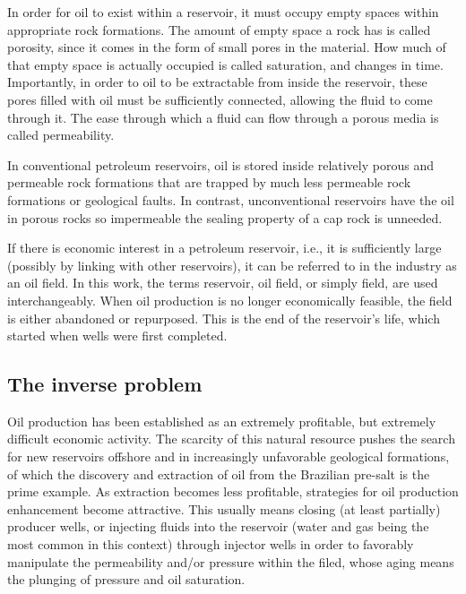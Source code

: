     In order for oil to exist within a reservoir, 
    it must occupy empty spaces within appropriate rock formations.
    The amount of empty space a rock has is called porosity, 
    since it comes in the form of small pores in the material.
    How much of that empty space is actually occupied is called saturation, and changes in time.
    Importantly, in order to oil to be extractable from inside the reservoir, 
    these pores filled with oil must be sufficiently connected,
    allowing the fluid to come through it.
    The ease through which a fluid can flow through a porous media is called permeability.

    In conventional petroleum reservoirs,
    oil is stored inside relatively porous and permeable rock formations 
    that are trapped by much less permeable rock formations or geological faults.
    In contrast, unconventional reservoirs have the oil in porous rocks 
    so impermeable the sealing property of a cap rock is unneeded.    

    If there is economic interest in a petroleum reservoir, 
    i.e., it is sufficiently large (possibly by linking with other reservoirs),
    it can be referred to in the industry as an oil field. 
    In this work, the terms reservoir, oil field, or simply field, are used interchangeably.
    When oil production is no longer economically feasible, the field is either abandoned or repurposed.
    This is the end of the reservoir's life, which started when wells were first completed. 

    \subsection{The inverse problem}
    \label{subsec:inverse-problem}
    Oil production has been established as an extremely profitable, but extremely difficult economic activity.
    The scarcity of this natural resource pushes the search for new reservoirs offshore 
    and in increasingly unfavorable geological formations, 
    of which the discovery and extraction of oil from the Brazilian pre-salt is the prime example.
    As extraction becomes less profitable, strategies for oil production enhancement become attractive.
    This usually means closing (at least partially) producer wells, 
    or injecting fluids into the reservoir 
    (water and gas being the most common in this context) 
    through injector wells in order to favorably manipulate the permeability and/or pressure within the filed,
    whose aging means the plunging of pressure and oil saturation.

